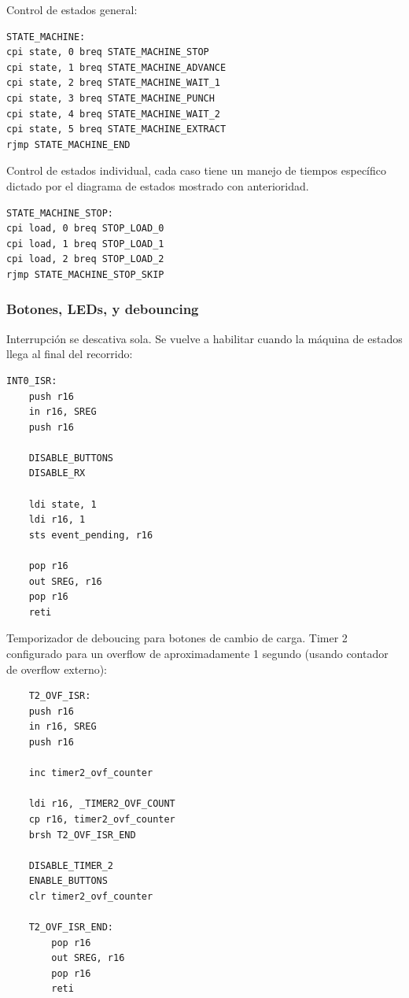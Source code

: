 Control de estados general:
\begin{verbatim}
STATE_MACHINE:
cpi state, 0 breq STATE_MACHINE_STOP
cpi state, 1 breq STATE_MACHINE_ADVANCE
cpi state, 2 breq STATE_MACHINE_WAIT_1
cpi state, 3 breq STATE_MACHINE_PUNCH
cpi state, 4 breq STATE_MACHINE_WAIT_2
cpi state, 5 breq STATE_MACHINE_EXTRACT
rjmp STATE_MACHINE_END
\end{verbatim}

Control de estados individual, cada caso tiene un manejo de tiempos específico dictado por el diagrama de estados mostrado con anterioridad.
\begin{verbatim}
STATE_MACHINE_STOP:
cpi load, 0 breq STOP_LOAD_0
cpi load, 1 breq STOP_LOAD_1
cpi load, 2 breq STOP_LOAD_2
rjmp STATE_MACHINE_STOP_SKIP
\end{verbatim}

\subsubsection{Botones, LEDs,  y debouncing}
Interrupción se descativa sola. Se vuelve a habilitar cuando la máquina de estados llega al final del recorrido:

\begin{verbatim}
INT0_ISR:
    push r16
    in r16, SREG
    push r16 

    DISABLE_BUTTONS
    DISABLE_RX

    ldi state, 1
    ldi r16, 1 
    sts event_pending, r16

    pop r16
    out SREG, r16
    pop r16 
    reti
\end{verbatim}

Temporizador de deboucing para botones de cambio de carga. Timer 2 configurado para un overflow de aproximadamente 1 segundo (usando contador de overflow externo):

\begin{verbatim}
    T2_OVF_ISR:
	push r16 
    in r16, SREG 
	push r16 
	
	inc timer2_ovf_counter
	
	ldi r16, _TIMER2_OVF_COUNT 
    cp r16, timer2_ovf_counter 
    brsh T2_OVF_ISR_END 
    
	DISABLE_TIMER_2
	ENABLE_BUTTONS
	clr timer2_ovf_counter
    
    T2_OVF_ISR_END:
		pop r16
		out SREG, r16
		pop r16	
		reti

\end{verbatim}

\newpage


